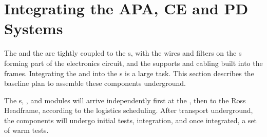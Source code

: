 \section{Integrating the APA, CE and PD Systems}
\label{sec:fdsp-tc-apa-integ}



The   and the  are tightly coupled to the s, with the wires and filters on the s forming part of the electronics circuit, and the  supports and cabling built into the frames. Integrating the  and  into the s is a large task.  This section describes the baseline plan to assemble these components underground.  

The s, , and  modules will arrive independently first at the , then to the Ross Headframe, according to the logistics scheduling. After transport  underground, the components will undergo initial tests, integration, and once integrated, a set of warm tests. %

